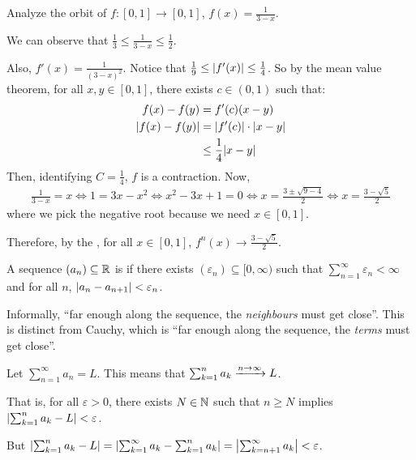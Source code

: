 \documentclass[class=pmath370,tikz,notes]{agony}
\begin{document}
\begin{example}
  Analyze the orbit of $f : [0,1] \to [0,1]$, $f(x) = \frac{1}{3-x}$.
\end{example}
\begin{sol}
  We can observe that $\frac13 \leq \frac{1}{3-x} \leq \frac12$.

  Also, $f'(x) = \frac{1}{(3-x)^2}$.
  Notice that $\frac19 \leq \abs{f'(x)} \leq \frac14$.
  So by the mean value theorem, for all $x,y \in [0,1]$,
  there exists $c \in (0,1)$ such that:
  \begin{align*}
    f(x) - f(y)       & = f'(c)(x-y)                \\
    \abs{f(x) - f(y)} & = \abs{f'(c)}\cdot\abs{x-y} \\
                      & \leq \frac14\abs{x-y}
  \end{align*}
  Then, identifying $C = \frac14$, $f$ is a contraction. Now,
  \begin{align*}
    \frac{1}{3-x} = x \iff 1 = 3x-x^2 \iff x^2 - 3x + 1 = 0 \iff x = \frac{3\pm \sqrt{9-4}}{2} \iff x = \frac{3-\sqrt{5}}{2}
  \end{align*}
  where we pick the negative root because we need $x \in [0,1]$.

  Therefore, by the ,
  for all $x \in [0,1]$, $f^n(x) \to \frac{3-\sqrt5}{2}$.
\end{sol}

\begin{defn}
  A sequence $(a_n) \subseteq \mathbb{R}$ is  if there exists
  $(\varepsilon_n) \subseteq [0,\infty)$ such that
  $\sum_{n=1}^\infty \varepsilon_n < \infty$
  and for all $n$, $\abs{a_n - a_{n+1}} < \varepsilon_n$.
\end{defn}

Informally, ``far enough along the sequence, the \emph{neighbours}
must get close''.
This is distinct from Cauchy, which is ``far enough along the sequence,
the \emph{terms} must get close''.

\begin{remark}
  Let $\sum_{n=1}^\infty a_n = L$.
  This means that $\sum_{k=1}^n a_k \xrightarrow{n\to \infty} L$.

  That is, for all $\varepsilon > 0$, there exists $N \in \mathbb{N}$
  such that $n \geq N$ implies $\abs{\sum_{k=1}^n a_k - L} < \varepsilon$.

  But $\abs{\sum_{k=1}^n a_k - L} = \abs{\sum_{k=1}^\infty a_k - \sum_{k=1}^n a_k}
    = \abs{\sum_{k=n+1}^\infty a_k} < \varepsilon$.
\end{remark}
\end{document}
